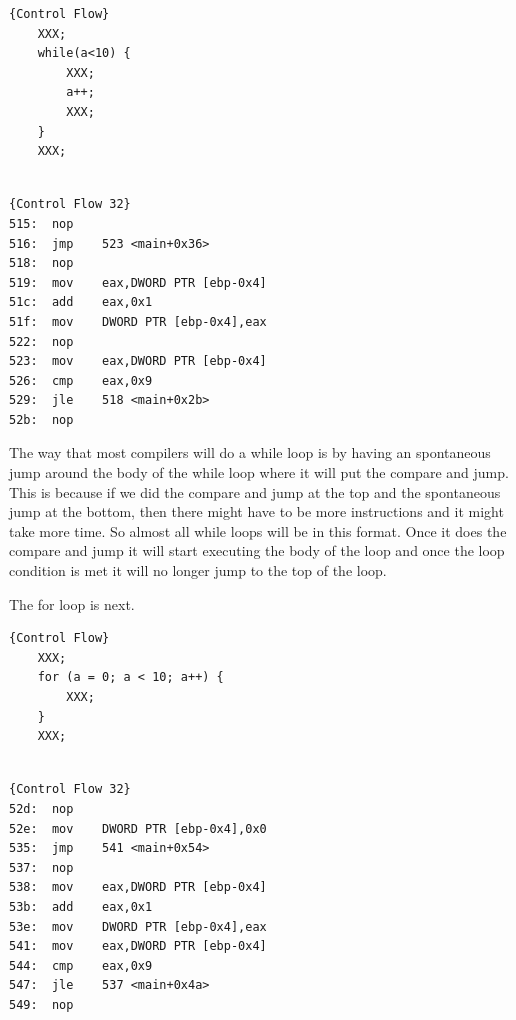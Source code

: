 \documentclass{report}
\begin{document}
\begin{minipage}{.45\textwidth}
\begin{lstlisting}[caption=Control Flow while loops,frame=tlrb]{Control Flow}
    XXX;
    while(a<10) {
        XXX;
        a++;
        XXX;
    }
    XXX;


\end{lstlisting}
\end{minipage}\hfill
\begin{minipage}{.45\textwidth}
\begin{lstlisting}[caption=assembly 32bit,frame=tlrb]{Control Flow 32}
515:  nop
516:  jmp    523 <main+0x36>
518:  nop
519:  mov    eax,DWORD PTR [ebp-0x4]
51c:  add    eax,0x1
51f:  mov    DWORD PTR [ebp-0x4],eax
522:  nop
523:  mov    eax,DWORD PTR [ebp-0x4]
526:  cmp    eax,0x9
529:  jle    518 <main+0x2b>
52b:  nop
\end{lstlisting}
\end{minipage}
\newline

The way that most compilers will do a while loop is by having an spontaneous jump around the body of the while loop where it will put the compare and jump.  This is because if we did the compare and jump at the top and the spontaneous jump at the bottom, then there might have to be more instructions and it might take more time.  So almost all while loops will be in this format.  Once it does the compare and jump it will start executing the body of the loop and once the loop condition is met it will no longer jump to the top of the loop.\newline

The for loop is next.

\begin{minipage}{.45\textwidth}
\begin{lstlisting}[caption=Control Flow for loops,frame=tlrb]{Control Flow}
    XXX;
    for (a = 0; a < 10; a++) {
        XXX;
    }
    XXX;


\end{lstlisting}
\end{minipage}\hfill
\begin{minipage}{.45\textwidth}
\begin{lstlisting}[caption=assembly 32bit,frame=tlrb]{Control Flow 32}
52d:  nop
52e:  mov    DWORD PTR [ebp-0x4],0x0
535:  jmp    541 <main+0x54>
537:  nop
538:  mov    eax,DWORD PTR [ebp-0x4]
53b:  add    eax,0x1
53e:  mov    DWORD PTR [ebp-0x4],eax
541:  mov    eax,DWORD PTR [ebp-0x4]
544:  cmp    eax,0x9
547:  jle    537 <main+0x4a>
549:  nop


\end{lstlisting}
\end{minipage}
\newline
\end{document}
